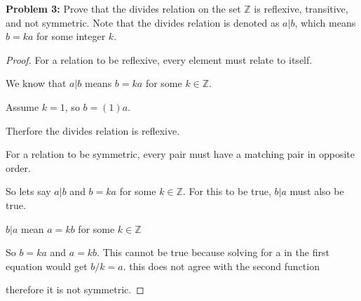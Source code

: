 \documentclass[12pt]{article}
\def\Z{\mathbb Z}
\begin{document}
{\bf Problem 3:} Prove that the divides relation on the set $\Z$ is reflexive, transitive, and not symmetric. Note that the divides relation is denoted as $a|b$, which means $b=ka$ for some integer $k$. 

\begin{proof}

    For a relation to be reflexive, every element must relate to itself.

    We know that $a|b$ means $b=ka$ for some $k\in\Z$. 
    
    Assume $k=1$, so $b=(1)a$.

    Therfore the divides relation is reflexive.

    For a relation to be symmetric, every pair must have a matching pair in opposite order.

    So lets say $a|b$ and $b=ka$ for some $k\in\Z$. For this to be true, $b|a$ must also be true.

    $b|a$ mean $a=kb$ for some $k\in\Z$
    
    So $b=ka$ and $a=kb$. This cannot be true because solving for a in the first equation would get $b/k = a$. this does not agree with the second function

    therefore it is not symmetric.
    



\end{proof}
\end{document}
